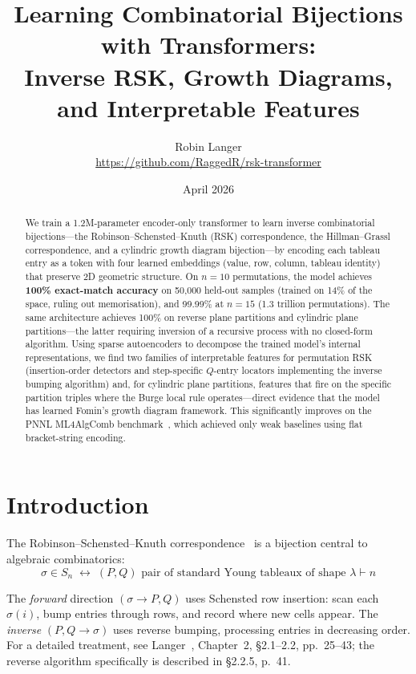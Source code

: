 \documentclass[11pt,a4paper]{article}
\title{\textbf{Learning Combinatorial Bijections with Transformers:\\Inverse RSK, Growth Diagrams, and Interpretable Features}}
\author{Robin Langer\\[4pt]
\small \url{https://github.com/RaggedR/rsk-transformer}}
\date{April 2026}
\begin{document}
\maketitle

\begin{abstract}
We train a 1.2M-parameter encoder-only transformer to learn inverse combinatorial bijections---the Robinson--Schensted--Knuth (RSK) correspondence, the Hillman--Grassl correspondence, and a cylindric growth diagram bijection---by encoding each tableau entry as a token with four learned embeddings (value, row, column, tableau identity) that preserve 2D geometric structure. On $n{=}10$ permutations, the model achieves \textbf{100\% exact-match accuracy} on 50,000 held-out samples (trained on 14\% of the space, ruling out memorisation), and 99.99\% at $n{=}15$ (1.3 trillion permutations). The same architecture achieves 100\% on reverse plane partitions and cylindric plane partitions---the latter requiring inversion of a recursive process with no closed-form algorithm. Using sparse autoencoders to decompose the trained model's internal representations, we find two families of interpretable features for permutation RSK (insertion-order detectors and step-specific $Q$-entry locators implementing the inverse bumping algorithm) and, for cylindric plane partitions, features that fire on the specific partition triples where the Burge local rule operates---direct evidence that the model has learned Fomin's growth diagram framework. This significantly improves on the PNNL ML4AlgComb benchmark~\cite{pnnl}, which achieved only weak baselines using flat bracket-string encoding.
\end{abstract}

\section{Introduction}

The Robinson--Schensted--Knuth correspondence~\cite{knuth1970,schensted1961} is a bijection central to algebraic combinatorics:
\[
\sigma \in S_n \;\longleftrightarrow\; (P, Q) \text{ pair of standard Young tableaux of shape } \lambda \vdash n
\]

The \emph{forward} direction $(\sigma \to P, Q)$ uses Schensted row insertion: scan each $\sigma(i)$, bump entries through rows, and record where new cells appear. The \emph{inverse} $(P, Q \to \sigma)$ uses reverse bumping, processing entries in decreasing order. For a detailed treatment, see Langer~\cite{langer2013}, Chapter~2, \S2.1--2.2, pp.~25--43; the reverse algorithm specifically is described in \S2.2.5, p.~41.
\end{document}
